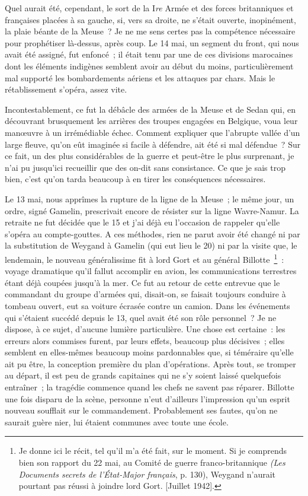 \documentclass[french,twoside]{book} %
\begin{document}
Quel aurait été, cependant, le sort de la I\emph{re} Armée et des forces britanniques et françaises placées à sa gauche, si, vers sa droite, ne s’était ouverte, inopinément, la plaie béante de la Meuse ? Je ne me sens certes pas la compétence nécessaire pour prophétiser là-dessus, après coup. Le 14 mai, un segment du front, qui nous avait été assigné, fut enfoncé ; il était tenu par une de ces divisions marocaines dont les éléments indigènes semblent avoir au début du moins, particulièrement mal supporté les bombardements aériens et les attaques par chars. Mais le rétablissement s’opéra, assez vite.\par
Incontestablement, ce fut la débâcle des armées de la Meuse et de Sedan qui, en découvrant brusquement les arrières des troupes engagées en Belgique, voua leur manœuvre à un irrémédiable échec. Comment expliquer que l’abrupte vallée d’un large fleuve, qu’on eût imaginée si facile à défendre, ait été si mal défendue ? Sur ce fait, un des plus considérables de la guerre et peut-être le plus surprenant, je n’ai pu jusqu’ici recueillir que des on-dit sans consistance. Ce que je sais trop bien, c’est qu’on tarda beaucoup à en tirer les conséquences nécessaires.\par
Le 13 mai, nous apprîmes la rupture de la ligne de la Meuse ; le même jour, un ordre, signé Gamelin,   prescrivait encore de résister sur la ligne Wavre-Namur. La retraite ne fut décidée que le 15 et j’ai déjà eu l’occasion de rappeler qu’elle s’opéra au compte-gouttes. A ces méthodes, rien ne parut avoir été changé ni par la substitution de Weygand à Gamelin (qui eut lieu le 20) ni par la visite que, le lendemain, le nouveau généralissime fit à lord Gort et au général Billotte \footnote{ Je donne ici le récit, tel qu’il m’a été fait, sur le moment. Si je comprends bien son rapport du 22 mai, au Comité de guerre franco-britannique \emph{(Les Documents secrets de l’État-Major français}, p. 130), Weygand n’aurait pourtant pas réussi à joindre lord Gort. [Juillet 1942].} : voyage dramatique qu’il fallut accomplir en avion, les communications terrestres étant déjà coupées jusqu’à la mer. Ce fut au retour de cette entrevue que le commandant du groupe d’armées qui, disait-on, se faisait toujours conduire à tombeau ouvert, eut sa voiture écrasée contre un camion. Dans les événements qui s’étaient succédé depuis le 13, quel avait été son rôle personnel ? Je ne dispose, à ce sujet, d’aucune lumière particulière. Une chose est certaine : les erreurs alors commises furent, par leurs effets, beaucoup plus décisives ; elles semblent en elles-mêmes beaucoup moins pardonnables que, si téméraire qu’elle ait pu être, la conception première du plan d’opérations. Après tout, se tromper au départ, il est peu de grands capitaines qui ne s’y soient laissé quelquefois entraîner ; la tragédie commence quand les chefs ne savent pas réparer. Billotte une fois disparu de la scène, personne n’eut d’ailleurs l’impression qu’un esprit nouveau soufflait sur le commandement. Probablement ses fautes, qu’on ne saurait guère nier, lui étaient communes avec toute une école.\par
\end{document}
